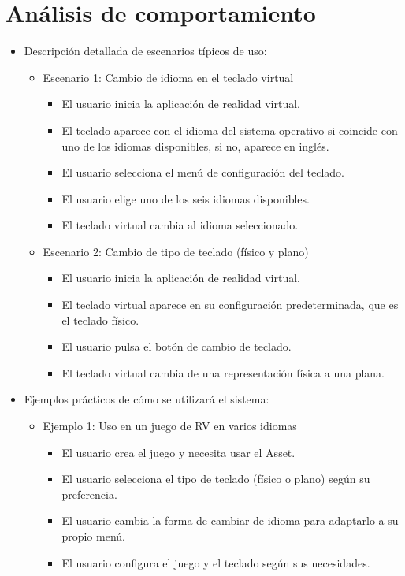 \section{Análisis de comportamiento}

\begin{itemize}
	\item Descripción detallada de escenarios típicos de uso:
	\begin{itemize}
		\item Escenario 1: Cambio de idioma en el teclado virtual
		\begin{itemize}
			\item El usuario inicia la aplicación de realidad virtual.
			\item El teclado aparece con el idioma del sistema operativo si coincide con uno de los idiomas disponibles, si no, aparece en inglés.
			\item El usuario selecciona el menú de configuración del teclado.
			\item El usuario elige uno de los seis idiomas disponibles.
			\item El teclado virtual cambia al idioma seleccionado.
		\end{itemize}
		\item Escenario 2: Cambio de tipo de teclado (físico y plano)
		\begin{itemize}
			\item El usuario inicia la aplicación de realidad virtual.
			\item El teclado virtual aparece en su configuración predeterminada, que es el teclado físico.
			\item El usuario pulsa el botón de cambio de teclado.
			\item El teclado virtual cambia de una representación física a una plana.
		\end{itemize}
	\end{itemize}
	
	\item Ejemplos prácticos de cómo se utilizará el sistema:
	\begin{itemize}
		\item Ejemplo 1: Uso en un juego de RV en varios idiomas
		\begin{itemize}
			\item El usuario crea el juego y necesita usar el Asset.
			\item El usuario selecciona el tipo de teclado (físico o plano) según su preferencia.
			\item El usuario cambia la forma de cambiar de idioma para adaptarlo a su propio menú.
			\item El usuario configura el juego y el teclado según sus necesidades.
		\end{itemize}
		

\end{itemize}
\end{itemize}
